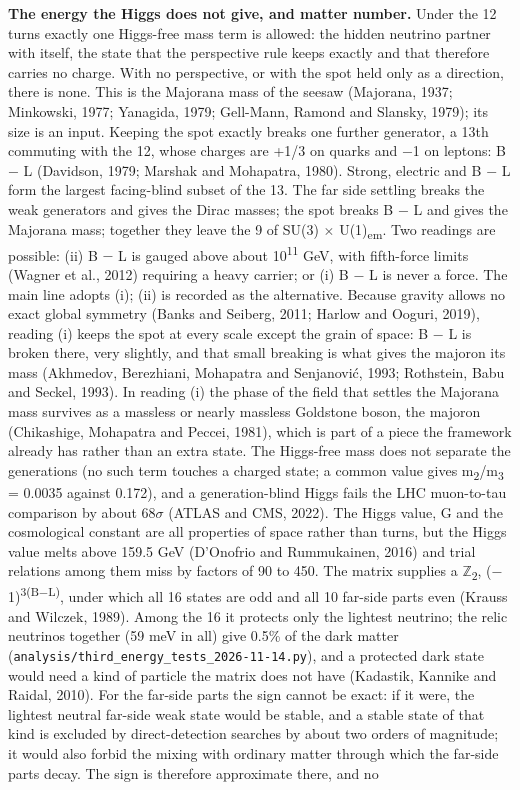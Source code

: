 \documentclass[
  11pt,
]{article}
\newcounter{none} %
\begin{document}
\textbf{The energy the Higgs does not give, and matter number.} Under the 12 turns exactly one Higgs-free mass term is allowed: the hidden neutrino partner with itself, the state that the perspective rule keeps exactly and that therefore carries no charge. With no perspective, or with the spot held only as a direction, there is none. This is the Majorana mass of the seesaw (Majorana, 1937; Minkowski, 1977; Yanagida, 1979; Gell-Mann, Ramond and Slansky, 1979); its size is an input. Keeping the spot exactly breaks one further generator, a 13th commuting with the 12, whose charges are +1/3 on quarks and \ensuremath{-}1 on leptons: B \ensuremath{-} L (Davidson, 1979; Marshak and Mohapatra, 1980). Strong, electric and B \ensuremath{-} L form the largest facing-blind subset of the 13. The far side settling breaks the weak generators and gives the Dirac masses; the spot breaks B \ensuremath{-} L and gives the Majorana mass; together they leave the 9 of SU(3) \ensuremath{\times} U(1)\textsubscript{em}. Two readings are possible: (ii) B \ensuremath{-} L is gauged above about 10\textsuperscript{11} GeV, with fifth-force limits (Wagner et al., 2012) requiring a heavy carrier; or (i) B \ensuremath{-} L is never a force. The main line adopts (i); (ii) is recorded as the alternative. Because gravity allows no exact global symmetry (Banks and Seiberg, 2011; Harlow and Ooguri, 2019), reading (i) keeps the spot at every scale except the grain of space: B \ensuremath{-} L is broken there, very slightly, and that small breaking is what gives the majoron its mass (Akhmedov, Berezhiani, Mohapatra and Senjanović, 1993; Rothstein, Babu and Seckel, 1993). In reading (i) the phase of the field that settles the Majorana mass survives as a massless or nearly massless Goldstone boson, the majoron (Chikashige, Mohapatra and Peccei, 1981), which is part of a piece the framework already has rather than an extra state. The Higgs-free mass does not separate the generations (no such term touches a charged state; a common value gives m\textsubscript{2}/m\textsubscript{3} = 0.0035 against 0.172), and a generation-blind Higgs fails the LHC muon-to-tau comparison by about 68\ensuremath{\sigma} (ATLAS and CMS, 2022). The Higgs value, G and the cosmological constant are all properties of space rather than turns, but the Higgs value melts above 159.5 GeV (D'Onofrio and Rummukainen, 2016) and trial relations among them miss by factors of 90 to 450. The matrix supplies a \ensuremath{\mathbb{Z}}\textsubscript{2}, (\ensuremath{-}1)\textsuperscript{3(B\ensuremath{-}L)}, under which all 16 states are odd and all 10 far-side parts even (Krauss and Wilczek, 1989). Among the 16 it protects only the lightest neutrino; the relic neutrinos together (59 meV in all) give 0.5\% of the dark matter (\texttt{analysis/third\_energy\_tests\_2026-11-14.py}), and a protected dark state would need a kind of particle the matrix does not have (Kadastik, Kannike and Raidal, 2010). For the far-side parts the sign cannot be exact: if it were, the lightest neutral far-side weak state would be stable, and a stable state of that kind is excluded by direct-detection searches by about two orders of magnitude; it would also forbid the mixing with ordinary matter through which the far-side parts decay. The sign is therefore approximate there, and no 
\end{document}
